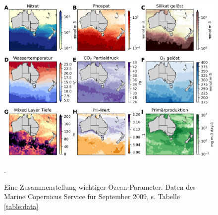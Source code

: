 \documentclass[12pt,a4paper,onecolumn]{scrartcl}
\begin{document}
\begin{figure}[!htb]
\includegraphics[width=\textwidth]{bilder/factors_collage.png}
\caption{Eine Zusammenstellung wichtiger Ozean-Parameter. Daten des  Marine Copernicus Service für September 2009, s. Tabelle \ref{table:data}}. \label{fig:factors_collage}
\end{figure}
\end{document}
